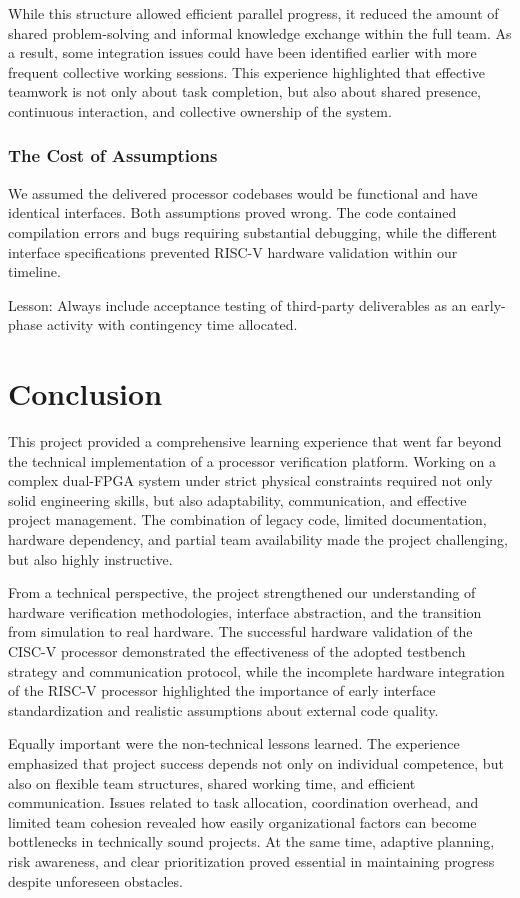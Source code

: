\documentclass[10pt]{article}
\begin{document}
While this structure allowed efficient parallel progress, it reduced the amount of shared problem-solving and informal knowledge exchange within the full team. As a result, some integration issues could have been identified earlier with more frequent collective working sessions. This experience highlighted that effective teamwork is not only about task completion, but also about shared presence, continuous interaction, and collective ownership of the system.

\subsubsection{The Cost of Assumptions}
We assumed the delivered processor codebases would be functional and have identical interfaces. Both assumptions proved wrong. The code contained compilation errors and bugs requiring substantial debugging, while the different interface specifications prevented RISC-V hardware validation within our timeline.

 Lesson: Always include acceptance testing of third-party deliverables as an early-phase activity with contingency time allocated.


\section{Conclusion}

This project provided a comprehensive learning experience that went far beyond the technical implementation of a processor verification platform. Working on a complex dual-FPGA system under strict physical constraints required not only solid engineering skills, but also adaptability, communication, and effective project management. The combination of legacy code, limited documentation, hardware dependency, and partial team availability made the project challenging, but also highly instructive.

From a technical perspective, the project strengthened our understanding of hardware verification methodologies, interface abstraction, and the transition from simulation to real hardware. The successful hardware validation of the CISC-V processor demonstrated the effectiveness of the adopted testbench strategy and communication protocol, while the incomplete hardware integration of the RISC-V processor highlighted the importance of early interface standardization and realistic assumptions about external code quality.

Equally important were the non-technical lessons learned. The experience emphasized that project success depends not only on individual competence, but also on flexible team structures, shared working time, and efficient communication. Issues related to task allocation, coordination overhead, and limited team cohesion revealed how easily organizational factors can become bottlenecks in technically sound projects. At the same time, adaptive planning, risk awareness, and clear prioritization proved essential in maintaining progress despite unforeseen obstacles.
\end{document}
